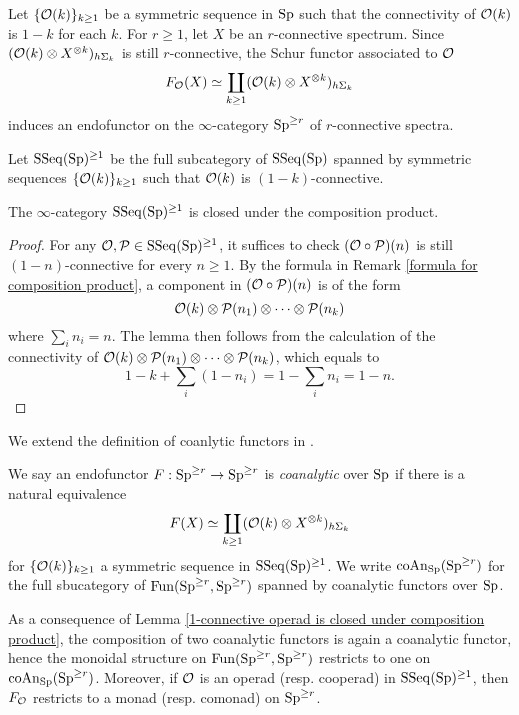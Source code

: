 Let $\{{\mathcal{O}}(k)\}_{k \geq 1}$ be a symmetric sequence in $\operatorname{Sp}$ such that the connectivity of ${\mathcal{O}}(k)$ is $1-k$ for each $k$. 
For $r \geq 1$, let $X$ be an $r$-connective spectrum.
 Since $({\mathcal{O}}(k) \otimes X^{\otimes k})_{h\Sigma_k}$ is still $r$-connective, the Schur functor associated to ${\mathcal{O}}$ 
    $$
    F_{{\mathcal{O}}}(X) \simeq 
    \coprod_{k \geq 1} ({\mathcal{O}}(k) \otimes X^{\otimes k})_{h\Sigma_k}
    $$
induces an endofunctor on the $\infty$-category $\operatorname{Sp}^{\geq r}$ of $r$-connective spectra.

Let $\operatorname{SSeq}(\operatorname{Sp})^{\geq 1}$ be the full subcategory of $\operatorname{SSeq}(\operatorname{Sp})$ spanned by symmetric sequences $\{{\mathcal{O}}(k)\}_{k \geq 1}$ such that ${\mathcal{O}}(k)$ is $(1-k)$-connective.
\begin{lemma}
\label{1-connective operad is closed under composition product}
	The $\infty$-category $\operatorname{SSeq}(\operatorname{Sp})^{\geq 1}$ is closed under the composition product.
\end{lemma}
\begin{proof}
	For any ${\mathcal{O}},{\mathcal{P}} \in \operatorname{SSeq}(\operatorname{Sp})^{\geq 1}$, it suffices to check $({\mathcal{O}} \circ {\mathcal{P}})(n)$ is still $(1-n)$-connective for every $n\geq 1$.
	By the formula in Remark \ref{formula for composition product}, a component in $({\mathcal{O}} \circ {\mathcal{P}})(n)$ is of the form
	$$
	{\mathcal{O}}(k) \otimes {\mathcal{P}}(n_1) \otimes \cdots \otimes {\mathcal{P}}(n_k)
	$$
	where $\sum_i n_i = n$. The lemma then follows from the calculation of the connectivity of 
	$	{\mathcal{O}}(k) \otimes {\mathcal{P}}(n_1) \otimes \cdots \otimes {\mathcal{P}}(n_k)$, which equals to 
	$$
	1- k + \sum_i (1-n_i)= 1 - \sum_in_i=1-n.
	$$
\end{proof}

We extend the definition of coanlytic functors in \cite[Definition 4.3]{heuts2018lie}.
\begin{definition}
\label{coanalytic functors on r-conn spectra}
We say an endofunctor $F:\operatorname{Sp}^{\geq r} \to \operatorname{Sp}^{\geq r}$ is \emph{coanalytic} over $\operatorname{Sp}$ if there is a natural equivalence
	$$
	F(X) \simeq
	\coprod_{k\geq 1} ({\mathcal{O}}(k)\otimes X^{\otimes k})_{h\Sigma_k}
	$$
	for $\{{\mathcal{O}}(k)\}_{k \geq 1}$ a symmetric sequence in $\operatorname{SSeq}(\operatorname{Sp})^{\geq 1}$. 
	We write $\operatorname{coAn}_{\operatorname{Sp}}(\operatorname{Sp}^{\geq r})$ for the full sbucategory of $\operatorname{Fun}(\operatorname{Sp}^{\geq r},\operatorname{Sp}^{\geq r})$ spanned by coanalytic functors over $\operatorname{Sp}$.
\end{definition}
As a consequence of Lemma \ref{1-connective operad is closed under composition product}, the composition of two coanalytic functors is again a coanalytic functor, hence the monoidal structure on $\operatorname{Fun}(\operatorname{Sp}^{\geq r}, \operatorname{Sp}^{\geq r})$ restricts to one on $\operatorname{coAn}_{\operatorname{Sp}}(\operatorname{Sp}^{\geq r})$.
Moreover, if ${\mathcal{O}}$ is an operad (resp. cooperad) in $\operatorname{SSeq}(\operatorname{Sp})^{\geq 1}$, then $F_{{\mathcal{O}}}$ restricts to a monad (resp. comonad) on $\operatorname{Sp}^{\geq r}$.

